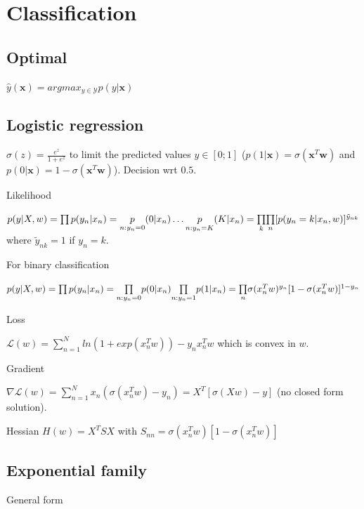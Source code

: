 \section{Classification}
\subsection{Optimal}
$\hat{y}(\mathbf{x}) = argmax_{y\in \mathcal{Y}} p(y|\mathbf{x})$

\subsection{Logistic regression}
$\sigma(z) = \frac{e^z}{1+e^z}$ to limit the predicted values $y\in [0;1]$ ($p(1|\mathbf{x}) = \sigma(\mathbf{x}^T\mathbf{w})$ and $p(0|\mathbf{x}) = 1-\sigma(\mathbf{x}^T\mathbf{w})$). Decision wrt $0.5$.

Likelihood

$p(y | X,w) = \prod p(y_n|x_n) \newline =\underset{n:y_n=0}p(0|x_n)\dots \underset{n:y_n=K}p(K|x_n) \newline = \underset{k}{\prod} \underset{n}{\prod}[p(y_n = k | x_n,w)]^{\tilde{y}_{nk}}$ \newline where ${\tilde{y}_{nk}} = 1$ if $y_n=k$.

For binary classification

$p(y | X, w) = \prod p(y_n|x_n) \newline= \underset{n:y_n=0}{\prod} p(0|x_n) \underset{n:y_n=1}{\prod} p(1|x_n) \newline = \underset{n}{\prod} \sigma({x_n^T w})^{y_n}[1-\sigma({x_n^T w})]^{1-y_n}$

Loss

$\mathcal{L}(w) = \sum_{n=1}^N ln(1 + exp(x_n^T w)) - y_n x_n^T w$ which is convex in $w$.

Gradient

$\nabla \mathcal{L}(w) = \sum_{n=1}^N x_n (\sigma(x_n^T w) - y_n) = X^T[\sigma(Xw) - y]$ (no closed form solution).

Hessian $H(w) = X^T S X$ \newline with $S_{nn} = \sigma(x_n^T w)[1-\sigma(x_n^T w)]$

\subsection{Exponential family}
General form

